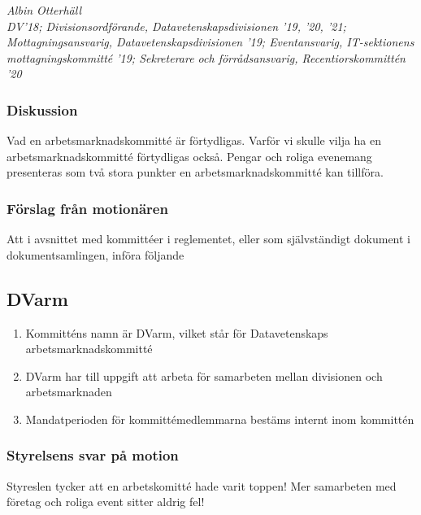 \documentclass[protokoll]{dvd}
\begin{document}
\emph{Albin Otterhäll\\DV'18; Divisionsordförande, Datavetenskapsdivisionen '19, '20, '21; Mottagningsansvarig, Datavetenskapsdivisionen '19; Eventansvarig, IT-sektionens mottagningskommitté '19; Sekreterare och förrådsansvarig, Recentiorskommittén '20}

    \subsubsection*{Diskussion}
    Vad en arbetsmarknadskommitté är förtydligas. Varför vi skulle vilja ha en arbetsmarknadskommitté förtydligas också.
    Pengar och roliga evenemang presenteras som två stora punkter en arbetsmarknadskommitté kan tillföra.

    \subsubsection*{Förslag från motionären}

        \begin{attsatser}
        \item Att i avsnittet med kommittéer i reglementet, eller som självständigt dokument i dokumentsamlingen, införa följande
        \begin{displayquote}
            \subsection*{DVarm}
            \begin{enumerate}[label=\arabic* §]
                \item Kommitténs namn är DVarm, vilket står för Datavetenskaps arbetsmarknadskommitté

                \item DVarm har till uppgift att arbeta för samarbeten mellan divisionen och arbetsmarknaden

                \item Mandatperioden för kommittémedlemmarna bestäms internt inom kommittén
            \end{enumerate}
        \end{displayquote}
    \end{attsatser}

    \subsubsection*{Styrelsens svar på motion}
    Styreslen tycker att en arbetskomitté hade varit toppen!
    Mer samarbeten med företag och roliga event sitter aldrig fel!
\end{document}
